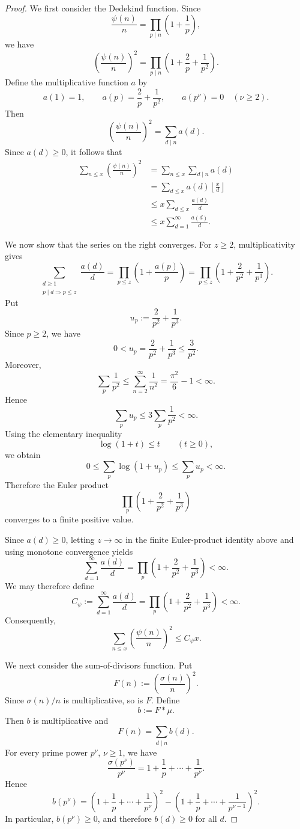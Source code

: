 \documentclass[10pt,a4paper]{amsart}
\begin{document}
\begin{proof}
We first consider the Dedekind function. Since
\[
\frac{\psi(n)}{n}
=
\prod_{p\mid n}\left(1+\frac1p\right),
\]
we have
\[
\left(\frac{\psi(n)}{n}\right)^2
=
\prod_{p\mid n}
\left(1+\frac2p+\frac1{p^2}\right).
\]
Define the multiplicative function \(a\) by
\[
a(1)=1,\qquad
a(p)=\frac2p+\frac1{p^2},
\qquad
a(p^\nu)=0\quad(\nu\geq2).
\]
Then
\[
\left(\frac{\psi(n)}{n}\right)^2
=
\sum_{d\mid n}a(d).
\]
Since \(a(d)\geq0\), it follows that
\[
\begin{aligned}
\sum_{n\leq x}\left(\frac{\psi(n)}{n}\right)^2
&=
\sum_{n\leq x}\sum_{d\mid n}a(d)\\
&=
\sum_{d\leq x}a(d)
\left\lfloor\frac{x}{d}\right\rfloor\\
&\leq
x\sum_{d\leq x}\frac{a(d)}{d}\\
&\leq
x\sum_{d=1}^{\infty}\frac{a(d)}{d}.
\end{aligned}
\]

We now show that the series on the right converges. For \(z\geq2\),
multiplicativity gives
\[
\sum_{\substack{d\geq1\\ p\mid d\Rightarrow p\leq z}}
\frac{a(d)}{d}
=
\prod_{p\leq z}
\left(1+\frac{a(p)}{p}\right)
=
\prod_{p\leq z}
\left(1+\frac2{p^2}+\frac1{p^3}\right).
\]
Put
\[
u_p:=\frac2{p^2}+\frac1{p^3}.
\]
Since \(p\geq2\), we have
\[
0<u_p
=
\frac2{p^2}+\frac1{p^3}
\leq
\frac3{p^2}.
\]
Moreover,
\[
\sum_p\frac1{p^2}
\leq
\sum_{n=2}^{\infty}\frac1{n^2}
=
\frac{\pi^2}{6}-1
<
\infty.
\]
Hence
\[
\sum_pu_p
\leq
3\sum_p\frac1{p^2}
<
\infty.
\]
Using the elementary inequality
\[
\log(1+t)\leq t
\qquad(t\geq0),
\]
we obtain
\[
0\leq
\sum_p\log(1+u_p)
\leq
\sum_pu_p
<
\infty.
\]
Therefore the Euler product
\[
\prod_p
\left(1+\frac2{p^2}+\frac1{p^3}\right)
\]
converges to a finite positive value.

Since \(a(d)\geq0\), letting \(z\to\infty\) in the finite Euler-product
identity above and using monotone convergence yields
\[
\sum_{d=1}^{\infty}\frac{a(d)}{d}
=
\prod_p
\left(1+\frac2{p^2}+\frac1{p^3}\right)
<\infty.
\]
We may therefore define
\[
C_\psi
:=
\sum_{d=1}^{\infty}\frac{a(d)}{d}
=
\prod_p
\left(1+\frac2{p^2}+\frac1{p^3}\right)
<\infty.
\]
Consequently,
\[
\sum_{n\leq x}
\left(\frac{\psi(n)}{n}\right)^2
\leq C_\psi x.
\]

We next consider the sum-of-divisors function. Put
\[
F(n):=\left(\frac{\sigma(n)}{n}\right)^2.
\]
Since \(\sigma(n)/n\) is multiplicative, so is \(F\). Define
\[
b:=F*\mu.
\]
Then \(b\) is multiplicative and
\[
F(n)=\sum_{d\mid n}b(d).
\]
For every prime power \(p^\nu\), \(\nu\geq1\), we have
\[
\frac{\sigma(p^\nu)}{p^\nu}
=
1+\frac1p+\cdots+\frac1{p^\nu}.
\]
Hence
\[
b(p^\nu)
=
\left(1+\frac1p+\cdots+\frac1{p^\nu}\right)^2
-
\left(1+\frac1p+\cdots+\frac1{p^{\nu-1}}\right)^2.
\]
In particular, \(b(p^\nu)\geq0\), and therefore \(b(d)\geq0\) for all \(d\).


\end{proof}
\end{document}
